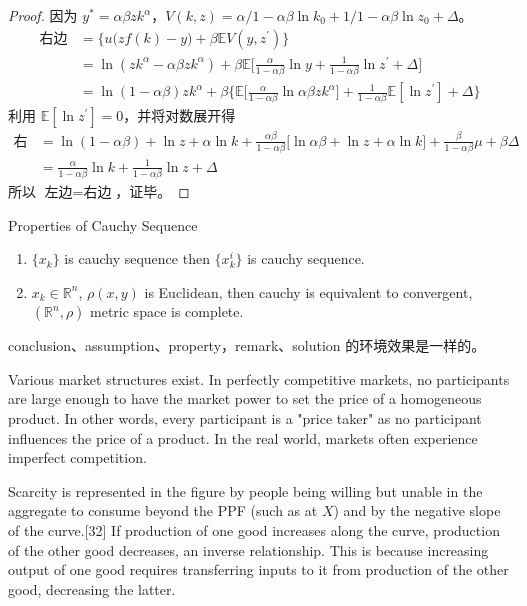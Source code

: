 \documentclass[titlestyle=hang,11pt]{elegantbook}
\begin{document}
\begin{proof}
因为 $y^*=\alpha\beta z k^\alpha$，$V(k,z)=\alpha/1-\alpha\beta\ln k_0+1/1-\alpha\beta \ln z_0+\Delta$。
   \begin{align*}
   \text{右边}&=\Big\{u\big(zf(k)-y\big)+\beta \mathbb{E}V(y,z^\prime)\Big\}\\
   &=\ln(zk^\alpha-\alpha\beta zk^\alpha)+\beta\mathbb{E}\Big[\frac{\alpha}{1-\alpha\beta}\ln y+\frac{1}{1-\alpha\beta}\ln z^\prime+\Delta\Big]\\
   &=\ln(1-\alpha\beta)zk^\alpha+\beta\Big\{\mathbb{E}\big[\frac{\alpha}{1-\alpha\beta}\ln \alpha\beta z k^\alpha\big]+\frac{1}{1-\alpha\beta}\mathbb{E}[\ln z^\prime]+\Delta\Big\}
   \end{align*}
利用 $\mathbb{E}[\ln z^\prime]=0$，并将对数展开得
   \begin{align*}
   \text{右边}&=\ln (1-\alpha\beta)+\ln z+\alpha\ln k+\frac{\alpha\beta}{1-\alpha\beta}\big[\ln \alpha\beta+\ln z+\alpha\ln k\big]+\frac{\beta}{1-\alpha\beta}\mu+\beta \Delta\\
   &=\frac{\alpha}{1-\alpha\beta}\ln k+\frac{1}{1-\alpha\beta}\ln z+\Delta
   \end{align*}
所以 $\text{左边}=\text{右边}$，证毕。
\end{proof}



\begin{property}
Properties of Cauchy Sequence
\begin{enumerate}[noitemsep]
\item $\{x_k\}$ is cauchy sequence then $\{x_k^i\}$ is cauchy sequence.
\item $x_k\in \mathbb{R}^n$, $\rho(x,y)$ is Euclidean, then cauchy is equivalent to convergent, $(\mathbb{R}^n,\rho)$ metric space is complete.
\end{enumerate}
\end{property}

\begin{note}
conclusion、assumption、property，remark、solution 的环境效果是一样的。
\end{note}

Various market structures exist. In perfectly competitive markets, no participants are large enough to have the market power to set the price of a homogeneous product. In other words, every participant is a "price taker" as no participant influences the price of a product. In the real world, markets often experience imperfect competition.

Scarcity is represented in the figure by people being willing but unable in the aggregate to consume beyond the PPF (such as at $X$) and by the negative slope of the curve.[32] If production of one good increases along the curve, production of the other good decreases, an inverse relationship. This is because increasing output of one good requires transferring inputs to it from production of the other good, decreasing the latter.
\end{document}
